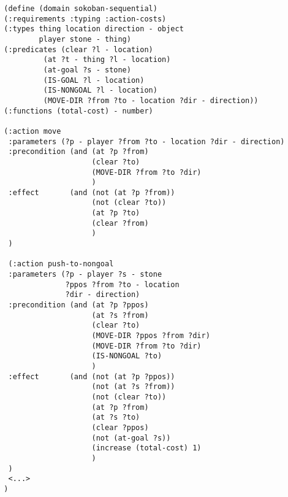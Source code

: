 \linespread{0.80}    
\begin{verbatim}
  (define (domain sokoban-sequential)
  (:requirements :typing :action-costs)
  (:types thing location direction - object
          player stone - thing)
  (:predicates (clear ?l - location)
	       (at ?t - thing ?l - location)
	       (at-goal ?s - stone)
	       (IS-GOAL ?l - location)
	       (IS-NONGOAL ?l - location)
           (MOVE-DIR ?from ?to - location ?dir - direction))
  (:functions (total-cost) - number)

  (:action move
   :parameters (?p - player ?from ?to - location ?dir - direction)
   :precondition (and (at ?p ?from)
                      (clear ?to)
                      (MOVE-DIR ?from ?to ?dir)
                      )
   :effect       (and (not (at ?p ?from))
                      (not (clear ?to))
                      (at ?p ?to)
                      (clear ?from)
                      )
   )
   
   (:action push-to-nongoal
   :parameters (?p - player ?s - stone
                ?ppos ?from ?to - location
                ?dir - direction)
   :precondition (and (at ?p ?ppos)
                      (at ?s ?from)
                      (clear ?to)
                      (MOVE-DIR ?ppos ?from ?dir)
                      (MOVE-DIR ?from ?to ?dir)
                      (IS-NONGOAL ?to)
                      )
   :effect       (and (not (at ?p ?ppos))
                      (not (at ?s ?from))
                      (not (clear ?to))
                      (at ?p ?from)
                      (at ?s ?to)
                      (clear ?ppos)
                      (not (at-goal ?s))
                      (increase (total-cost) 1)
                      )
   )
   <...>
  )
\end{verbatim}
\linespread{1.25}


